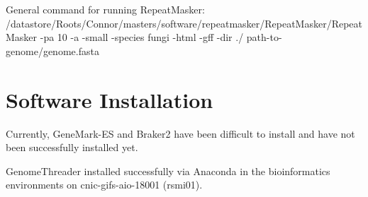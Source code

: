\documentclass[12pt]{article}
\begin{document}
General command for running RepeatMasker:
/datastore/Roots/Connor/masters/software/repeatmasker/RepeatMasker/RepeatMasker
-pa 10 -a -small -species fungi -html -gff -dir ./
path-to-genome/genome.fasta


\section{Software Installation}

Currently, GeneMark-ES and Braker2 have been difficult to install and
have not been successfully installed yet.

GenomeThreader installed successfully via Anaconda in the
bioinformatics environments on cnic-gifs-aio-18001 (rsmi01).
\end{document}
